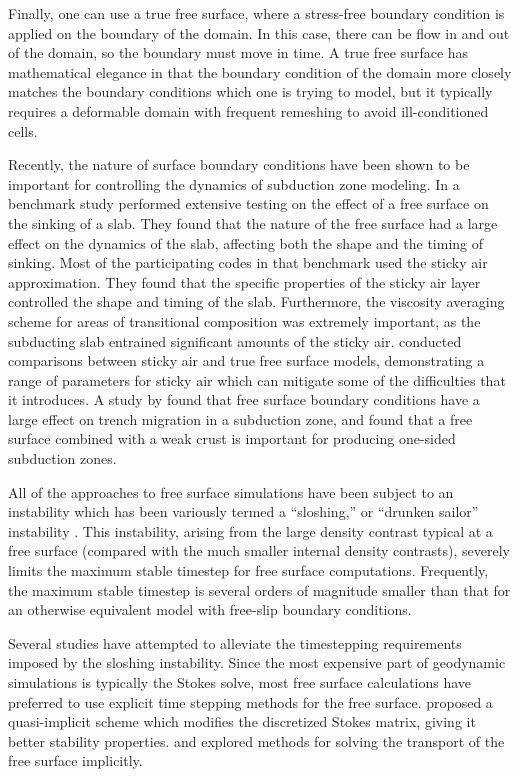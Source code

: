 \documentclass[preprint,12pt,authoryear]{elsarticle}
\begin{document}
Finally, one can use a true free surface, where a stress-free boundary condition is applied on the boundary 
of the domain. In this case, there can be flow in and out of the domain, so the boundary must move in time.
A true free surface has mathematical elegance in that the boundary condition of the domain more closely 
matches the boundary conditions which one is trying to model, but it typically requires a deformable 
domain with frequent remeshing to avoid ill-conditioned cells. 

Recently, the nature of surface boundary conditions have been shown to be important for controlling the 
dynamics of subduction zone modeling.  In a benchmark study \citet{schmeling2008benchmark} performed extensive testing on the effect
of a free surface on the sinking of a slab. They found that the nature of the free surface had a large effect 
on the dynamics of the slab, affecting both the shape and the timing of sinking. Most of the 
participating codes in that benchmark used the sticky air approximation.
They found that the specific properties of the sticky air layer controlled the shape and timing of the slab.
Furthermore, the viscosity averaging scheme for areas of transitional
composition was extremely important, as the subducting slab entrained significant amounts of the sticky air.
\citet{crameri2012comparison} conducted comparisons between sticky air and true free surface models, 
demonstrating a range of parameters for sticky air which can mitigate some of the difficulties that it introduces.
A study by \citet{quinquis2011role} found that free surface boundary conditions have a large effect on 
trench migration in a subduction zone, and \citet{crameri2012free} found that a free surface combined 
with a weak crust is important for producing one-sided subduction zones.

All of the approaches to free surface simulations have been subject to an instability which has been 
variously termed a ``sloshing,'' or ``drunken sailor'' instability \citep{kaus2010stabilization, duretz2011discretization, kramer2012implicit}. 
This instability, arising from the large density contrast typical at a free surface (compared with the much smaller 
internal density contrasts), severely limits the maximum stable timestep for free surface computations.
Frequently, the maximum stable timestep is several orders of magnitude smaller than that for an otherwise 
equivalent model with free-slip boundary conditions.

Several studies have attempted to alleviate the timestepping requirements imposed by the sloshing 
instability. Since the most expensive part of geodynamic simulations is typically the Stokes solve,
most free surface calculations have preferred to use explicit time stepping methods for the free 
surface. \citet{kaus2010stabilization} proposed a quasi-implicit scheme which modifies the discretized 
Stokes matrix, giving it better stability properties.  \citet{kramer2012implicit} and \citet{furuichi2015implicit}
explored methods for solving the transport of the free surface implicitly.
\end{document}
